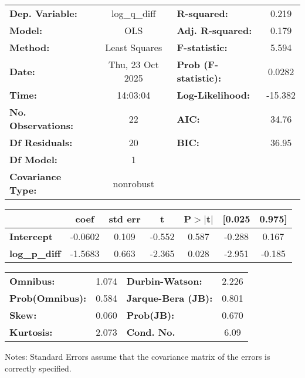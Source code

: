 \begin{center}
\begin{tabular}{lclc}
\toprule
\textbf{Dep. Variable:}    &   log\_q\_diff   & \textbf{  R-squared:         } &     0.219   \\
\textbf{Model:}            &       OLS        & \textbf{  Adj. R-squared:    } &     0.179   \\
\textbf{Method:}           &  Least Squares   & \textbf{  F-statistic:       } &     5.594   \\
\textbf{Date:}             & Thu, 23 Oct 2025 & \textbf{  Prob (F-statistic):} &   0.0282    \\
\textbf{Time:}             &     14:03:04     & \textbf{  Log-Likelihood:    } &   -15.382   \\
\textbf{No. Observations:} &          22      & \textbf{  AIC:               } &     34.76   \\
\textbf{Df Residuals:}     &          20      & \textbf{  BIC:               } &     36.95   \\
\textbf{Df Model:}         &           1      & \textbf{                     } &             \\
\textbf{Covariance Type:}  &    nonrobust     & \textbf{                     } &             \\
\bottomrule
\end{tabular}
\begin{tabular}{lcccccc}
                      & \textbf{coef} & \textbf{std err} & \textbf{t} & \textbf{P$> |$t$|$} & \textbf{[0.025} & \textbf{0.975]}  \\
\midrule
\textbf{Intercept}    &      -0.0602  &        0.109     &    -0.552  &         0.587        &       -0.288    &        0.167     \\
\textbf{log\_p\_diff} &      -1.5683  &        0.663     &    -2.365  &         0.028        &       -2.951    &       -0.185     \\
\bottomrule
\end{tabular}
\begin{tabular}{lclc}
\textbf{Omnibus:}       &  1.074 & \textbf{  Durbin-Watson:     } &    2.226  \\
\textbf{Prob(Omnibus):} &  0.584 & \textbf{  Jarque-Bera (JB):  } &    0.801  \\
\textbf{Skew:}          &  0.060 & \textbf{  Prob(JB):          } &    0.670  \\
\textbf{Kurtosis:}      &  2.073 & \textbf{  Cond. No.          } &     6.09  \\
\bottomrule
\end{tabular}
\end{center}

Notes: \newline
 [1] Standard Errors assume that the covariance matrix of the errors is correctly specified.